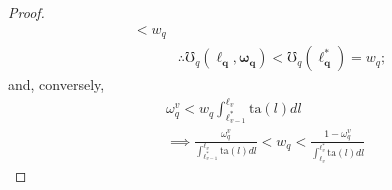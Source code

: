 \documentclass[hidelinks, nonatbib]{elsarticle}
\begin{document}
\begin{lemma}
\begin{proof}
\begin{align}
{{                }
            }
            <
            w_q
            \\
            &\therefore
            \mho_{q}(
                \boldsymbol{\ell_q}
                ,\boldsymbol{\omega_q}
            ) 
            <
            \mho_{q}(
                \boldsymbol{\ell_{q}^{*}}
            )
            =
            w_q
            ;
        \end{align}
        and, conversely, 
        \begin{align}
            &
            \omega_{q}^{v} < 
            w_q
            \int_{
                \ell_{v-1}^{*}
            }^{
                \ell_{v}
            }{
                \text{ta}(l)dl
            }
            \\
            &\implies
            \frac{
                \omega_{q}^{v}
            }{
                \int_{
                    \ell_{v-1}^{*}
                }^{
                    \ell_{v}
                }
                \text{ta}(l)dl
            }
            < 
            w_q
            <
            \frac{
                1-\omega_{q}^{v}
            }{
                \int_{
                    \ell_{v}
                }^{
                    \ell_{v}^{*}
                }
                \text{ta}(l)dl
            }

\end{align}
\end{proof}
\end{lemma}
\end{document}

